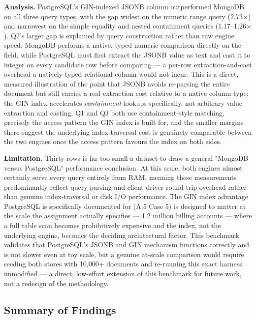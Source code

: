 \documentclass[11pt, a4paper]{article}
\makeatletter
\renewcommand{\_}{\origunderscore\penalty\z@\hskip\z@skip}
\renewcommand{\{}{\origlbrace\penalty\z@\hskip\z@skip}
\renewcommand{\}}{\origrbrace\penalty\z@\hskip\z@skip}
\makeatother
\begin{document}
\textbf{Analysis.} PostgreSQL's GIN-indexed JSONB column outperformed MongoDB on all three query types, with the gap widest on the numeric range query (2.73$\times$) and narrowest on the simple equality and nested containment queries (1.17--1.26$\times$). Q2's larger gap is explained by query construction rather than raw engine speed: MongoDB performs a native, typed numeric comparison directly on the field, while PostgreSQL must first extract the JSONB value as text and cast it to integer on every candidate row before comparing --- a per-row extraction-and-cast overhead a natively-typed relational column would not incur. This is a direct, measured illustration of the point that JSONB avoids re-parsing the entire document but still carries a real extraction cost relative to a native column type; the GIN index accelerates \textit{containment} lookups specifically, not arbitrary value extraction and casting. Q1 and Q3 both use containment-style matching, precisely the access pattern the GIN index is built for, and the smaller margins there suggest the underlying index-traversal cost is genuinely comparable between the two engines once the access pattern favours the index on both sides.

\textbf{Limitation.} Thirty rows is far too small a dataset to draw a general "MongoDB versus PostgreSQL" performance conclusion. At this scale, both engines almost certainly serve every query entirely from RAM, meaning these measurements predominantly reflect query-parsing and client-driver round-trip overhead rather than genuine index-traversal or disk I/O performance. The GIN index advantage PostgreSQL is specifically documented for (A.5 Case 5) is designed to matter at the scale the assignment actually specifies --- 1.2 million billing accounts --- where a full table scan becomes prohibitively expensive and the index, not the underlying engine, becomes the deciding architectural factor. This benchmark validates that PostgreSQL's JSONB and GIN mechanism functions correctly and is not slower even at toy scale, but a genuine at-scale comparison would require seeding both stores with 10,000+ documents and re-running this exact harness unmodified --- a direct, low-effort extension of this benchmark for future work, not a redesign of the methodology.

\subsection*{Summary of Findings}
\end{document}
